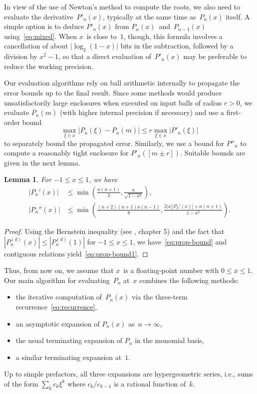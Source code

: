 \documentclass[11pt,a4paper]{article}
\newtheorem{lemma}[theorem]{Lemma}
\newcommand{\abs}[1]{\mathopen| #1 \mathclose|}
\begin{document}
In view of the use of Newton's method to compute the roots,
we also need to evaluate the derivative $P'_n(x)$,
typically at the same time as $P_n(x)$ itself.
A simple option is to deduce $P'_n(x)$ from
$P_n(x)$ and $P_{n-1}(x)$ using \eqref{eq:mixed}.
When $x$ is close to~$1$, though, this formula involves a
cancellation of about $\abs{\log_2(1 - x)}$ bits in the subtraction,
followed by a division by $x^2 - 1$, so that a direct evaluation
of $P'_n(x)$ may be preferable to reduce the working precision.

Our evaluation algorithms rely on ball arithmetic internally to
propagate the error bounds up to the final result.
Since some methods would produce unsatisfactorily large enclosures
when executed on input balls of radius $r > 0$, we evaluate $P_n(m)$
(with higher internal precision if necessary) and use a first-order
bound
\[ \max_{\xi \in x} |P_n(\xi) - P_n(m)|
   \le r \max_{\xi \in x} |P'_n(\xi)| \]
to separately bound the propagated error.
Similarly, we use a bound for $P''_n$ to compute a reasonably
tight enclosure for $P'_n([m \pm r])$.
Suitable bounds are given in the next lemma.

\begin{lemma} \label{lemma:prop-bound}
For $-1 \leq x \leq 1$, we have
\begin{align}
\label{eq:prop-bound}
  |P_n'(x)| &\le \min\left(\frac{n(n+1)}{2},
                          \frac{n}{\sqrt{1-x^2}}\right), \\
\label{eq:prop-bound1}
  |P_n''(x)| &\le \min\left(\frac{(n+2)(n+1)n(n-1)}{8},
                           \frac{2|x||P_n'(x)| + n(n+1)}{1-x^2}\right).
\end{align}
\end{lemma}

\begin{proof}

Using the Bernstein inequality (see \cite{borwein2012polynomials}, chapter 5)
and the fact that $|P^{(d)}_n(x)| \le |P^{(d)}_n(1)|$ for $-1 \le x \le 1$,
we have~\eqref{eq:prop-bound}
and contiguous relations yield~\eqref{eq:prop-bound1}.
\end{proof}

Thus, from now on, we assume that $x$~is a floating-point number with
$0 \leq x \leq 1$.
Our main algorithm for evaluating~$P_n$ at~$x$ combines the following
methods:
\begin{itemize}
  \item the iterative computation of~$P_n(x)$
  via the three-term recurrence~\eqref{eq:recurrence},
  \item an asymptotic expansion of $P_n(x)$ as~$n \to \infty$,
  \item the usual terminating expansion of $P_n$ in the monomial
  basis,
  \item a similar terminating expansion at~$1$.
\end{itemize}
Up to simple prefactors, all three expansions are hypergeometric
series, i.e., sums of the form $\sum_k c_k \xi^k$ where $c_k/c_{k-1}$
is a rational function of~$k$.
\end{document}
